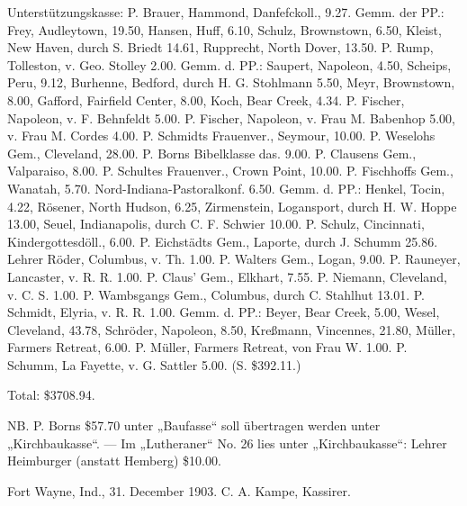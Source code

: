 Unterstützungskasse: P. Brauer, Hammond, Danfefckoll., 9.27. Gemm. der PP.: Frey, Audleytown, 19.50, Hansen, Huff, 6.10, Schulz, Brownstown, 6.50, Kleist, New Haven, durch S. Briedt 14.61, Rupprecht, North Dover, 13.50. P. Rump, Tolleston, v. Geo. Stolley 2.00. Gemm. d. PP.: Saupert, Napoleon, 4.50, Scheips, Peru, 9.12, Burhenne, Bedford, durch H. G. Stohlmann 5.50, Meyr, Brownstown, 8.00, Gafford, Fairfield Center, 8.00, Koch, Bear Creek, 4.34. P. Fischer, Napoleon, v. F. Behnfeldt 5.00. P. Fischer, Napoleon, v. Frau M. Babenhop 5.00, v. Frau M. Cordes 4.00. P. Schmidts Frauenver., Seymour, 10.00. P. Weselohs Gem., Cleveland, 28.00. P. Borns Bibelklasse das. 9.00. P. Clausens Gem., Valparaiso, 8.00. P. Schultes Frauenver., Crown Point, 10.00. P. Fischhoffs Gem., Wanatah, 5.70. Nord-Indiana-Pastoralkonf. 6.50. Gemm. d. PP.: Henkel, Tocin, 4.22, Rösener, North Hudson, 6.25, Zirmenstein, Logansport, durch H. W. Hoppe 13.00, Seuel, Indianapolis, durch C. F. Schwier 10.00. P. Schulz, Cincinnati, Kindergottesdöll., 6.00. P. Eichstädts Gem., Laporte, durch J. Schumm 25.86. Lehrer Röder, Columbus, v. Th. 1.00. P. Walters Gem., Logan, 9.00. P. Rauneyer, Lancaster, v. R. R. 1.00. P. Claus’ Gem., Elkhart, 7.55. P. Niemann, Cleveland, v. C. S. 1.00. P. Wambsgangs Gem., Columbus, durch C. Stahlhut 13.01. P. Schmidt, Elyria, v. R. R. 1.00. Gemm. d. PP.: Beyer, Bear Creek, 5.00, Wesel, Cleveland, 43.78, Schröder, Napoleon, 8.50, Kreßmann, Vincennes, 21.80, Müller, Farmers Retreat, 6.00. P. Müller, Farmers Retreat, von Frau W. 1.00. P. Schumm, La Fayette, v. G. Sattler 5.00. (S. \$392.11.)

Total: \$3708.94.

NB. P. Borns \$57.70 unter „Baufasse“ soll übertragen werden unter „Kirchbaukasse“. — Im „Lutheraner“ No. 26 lies unter „Kirchbaukasse“: Lehrer Heimburger (anstatt Hemberg) \$10.00.

Fort Wayne, Ind., 31. December 1903. C. A. Kampe, Kassirer.
